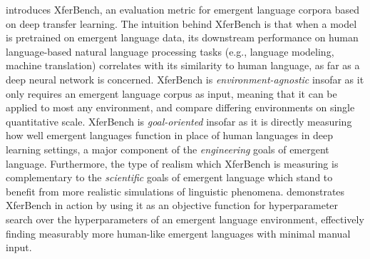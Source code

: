  introduces XferBench, an evaluation metric for emergent language corpora based on deep transfer learning.
The intuition behind XferBench is that when a model is pretrained on emergent language data, its downstream performance on human language-based natural language processing tasks (e.g., language modeling, machine translation) correlates with its similarity to human language, as far as a deep neural network is concerned.
XferBench is \emph{environment-agnostic} insofar as it only requires an emergent language corpus as input, meaning that it can be applied to most any environment, and compare differing environments on single quantitative scale.
XferBench is \emph{goal-oriented} insofar as it is directly measuring how well emergent languages function in place of human languages in deep learning settings, a major component of the \emph{engineering} goals of emergent language.
Furthermore, the type of realism which XferBench is measuring is complementary to the \emph{scientific} goals of emergent language which stand to benefit from more realistic simulations of linguistic phenomena.
 demonstrates XferBench in action by using it as an objective function for hyperparameter search over the hyperparameters of an emergent language environment, effectively finding measurably more human-like emergent languages with minimal manual input.




